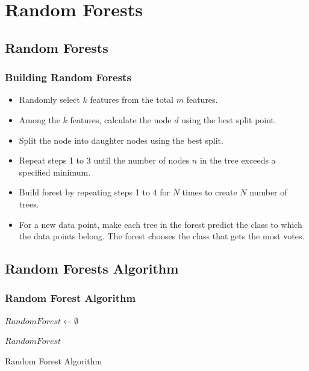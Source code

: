 \documentclass[11pt,aspectratio=1610,usenames,dvipsnames]{beamer} %
\begin{document}
\section{Random Forests}
\subsection{Random Forests}

\begin{frame}
	\frametitle{Building Random Forests}
		\begin{itemize}
			\item Randomly select $k$ features from the total $m$ features.
			\item Among the $k$ features, calculate the node $d$ using the best split point.
			\item Split the node into daughter nodes using the best split.
			\item Repeat steps 1 to 3 until the number of nodes $n$ in the tree exceeds a specified minimum.
			\item Build forest by repeating steps 1 to 4 for $N$ times to create $N$ number of trees.
			\item For a new data point, make each tree in the forest predict the class to which the data points belong. The forest chooses the class that gets the most votes.
		\end{itemize}
\end{frame}

\subsection{Random Forests Algorithm}
\begin{frame}[fragile]
\frametitle{Random Forest Algorithm}

\begin{algorithm}[H]
	\small
\SetAlgoLined
{}


$RandomForest \gets \emptyset$\;

\Return $RandomForest$\;
\caption{Random Forest Algorithm}
\label{alg:random_forest}
\end{algorithm}

\end{frame}
\end{document}
